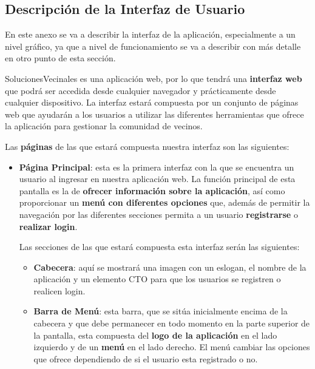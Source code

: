 \begin{appendices}
	
\section{Descripción de la Interfaz de Usuario}
\label{sec:apenA}

En este anexo se va a describir la interfaz de la aplicación, especialmente a un nivel gráfico, ya que a nivel de funcionamiento se va a describir con más detalle en otro punto de esta sección.

SolucionesVecinales es una aplicación web, por lo que tendrá una \textbf{interfaz web} que podrá ser accedida desde cualquier navegador y prácticamente desde cualquier dispositivo. La interfaz estará compuesta por un conjunto de páginas web que ayudarán a los usuarios a utilizar las diferentes herramientas que ofrece la aplicación para gestionar la comunidad de vecinos. 

Las \textbf{páginas} de las que estará compuesta nuestra interfaz son las siguientes:

\begin{itemize}
	\item \textbf{Página Principal}: esta es la primera interfaz con la que se encuentra un usuario al ingresar en nuestra aplicación web. La función principal de esta pantalla es la de \textbf{ofrecer información sobre la aplicación}, así como proporcionar un\textbf{ menú con diferentes opciones} que, además de permitir la navegación por las diferentes secciones permita a un usuario \textbf{registrarse} o \textbf{realizar \gls{login}}.
	
	Las secciones de las que estará compuesta esta interfaz serán las siguientes:
	
	\begin{itemize}
		\item \textbf{Cabecera}: aquí se mostrará una imagen con un eslogan, el nombre de la aplicación y un elemento \gls{CTO} para que los usuarios se registren o realicen login.
		
		\item \textbf{Barra de Menú}: esta barra, que se sitúa inicialmente encima de la cabecera y que debe permanecer en todo momento en la parte superior de la pantalla, esta compuesta del \textbf{logo de la aplicación} en el lado izquierdo y de un \textbf{menú} en el lado derecho. El menú cambiar las opciones que ofrece dependiendo de si el usuario esta registrado o no. 
		

\end{itemize}
\end{itemize}
\end{appendices}
